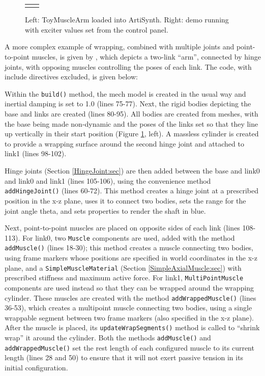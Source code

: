 \begin{figure}[h]
\begin{center}
\begin{tabular}{cc}
     \fi
  \end{tabular}
\end{center}
\caption{Left: ToyMuscleArm loaded into ArtiSynth. Right:
demo running with exciter values set from the control panel.}
\label{ToyMuscleArm:fig}
\end{figure}

A more complex example of wrapping, combined with multiple joints and
point-to-point muscles, is given by , which depicts a two-link ``arm'',
connected by hinge joints, with opposing muscles controlling the poses of
each link. The code, with include directives excluded, is given below:
\lstset{numbers=left} 
\iflatexml

\else

\fi
\lstset{numbers=none}

Within the {\tt build()} method, the mech model is created in the usual way and
inertial damping is set to 1.0 (lines 75-77). Next, the rigid bodies depicting
the base and links are created (lines 80-95). All bodies are created from
meshes, with the base being made non-dynamic and the poses of the links set so
that they line up vertically in their start position
(Figure \ref{ToyMuscleArm:fig}, left). A massless cylinder is created to
provide a wrapping surface around the second hinge joint and attached to link1
(lines 98-102). 

Hinge joints (Section \ref{HingeJoint:sec}) are then added between the base and
link0 and link0 and link1 (lines 105-106), using the convenience method {\tt
addHingeJoint()} (lines 60-72). This method creates a hinge joint at a prescribed
position in the x-z plane, uses it to connect two bodies, sets the range for
the joint angle {\sf theta}, and sets properties to render the shaft in blue.

Next, point-to-point muscles are placed on opposite sides of each link (lines
108-113). For link0, two {\tt Muscle} components are used, added with the
method {\tt addMuscle()} (lines 18-30); this method creates a muscle connecting
two bodies, using frame markers whose positions are specified in world
coordinates in the x-z plane, and a {\tt SimpleMuscleMaterial}
(Section \ref{SimpleAxialMuscle:sec}) with prescribed stiffness and maximum
active force. For link1, {\tt MultiPointMuscle} components are used instead so
that they can be wrapped around the wrapping cylinder. These muscles are created
with the method {\tt addWrappedMuscle()} (lines 36-53), which creates a
multipoint muscle connecting two bodies, using a single wrappable segment
between two frame markers (also specified in the x-z plane). After the muscle
is placed, its {\tt updateWrapSegments()} method is called to ``shrink wrap''
it around the cylinder. Both the methods {\tt addMuscle()} and {\tt
addWrappedMuscle()} set the rest length of each configured muscle to its
current length (lines 28 and 50) to ensure that it will not exert passive
tension in its initial configuration.

